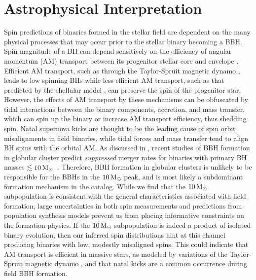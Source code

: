 \section{Astrophysical Interpretation} \label{sec:astro}


Spin predictions of binaries formed in the stellar field are dependent on the many physical processes that may occur prior to the stellar binary becoming a BBH.  Spin magnitude of a BH can depend sensitively on the efficiency of angular momentum (AM) transport between its progenitor stellar core and envelope \citep{2203.02515}. Efficient AM transport, such as through the Taylor-Spruit magnetic dynamo \citep{10.1051/0004-6361:20011465}, leads to low spinning BHs \citep{10.3847/2041-8213/ab339b} while less efficient AM transport, such as that predicted by the shellular model \citep{1992A&A...265..115Z,2012A&A...537A.146E,10.3847/1538-4365/aacb24,2019MNRAS.485.4641C}, can preserve the spin of the progenitor star. However, the effects of AM transport by these mechanisms can be obfuscated by tidal interactions between the binary components, accretion, and mass transfer, which can spin up the binary or increase AM transport efficiency, thus shedding spin. Natal supernova kicks are thought to be the leading cause of spin orbit misalignments in field binaries, while tidal forces and mass transfer tend to align BH spins with the orbital AM. As discussed in \citet{2111.03634}, recent studies of BBH formation in globular cluster predict \emph{suppressed} merger rates for binaries with primary BH masses $\lesssim 10 {\,\rm M}_\odot$~\cite{2009.01861,1906.10260,1808.04514}.  Therefore, BBH formation in globular clusters is unlikely to be responsible for the BBHs in the $10{\,\rm M}_\odot$ peak, and is most likely a subdominant formation mechanism in the catalog.
While we find that the $10{\,\rm M}_\odot$ subpopulation is consistent with the general characteristics associated with field formation, large uncertainties in both spin measurements and predictions from population synthesis models prevent us from placing informative constraints on the formation physics. If the $10{\,\rm M}_\odot$ subpopulation is indeed a product of isolated binary evolution, then our inferred spin distributions hint at this channel producing binaries with low, modestly misaligned spins. This could indicate that AM transport is efficient in massive stars, as modeled by variations of the Taylor-Spruit magnetic dynamo \citep{1706.07053}, and that natal kicks are a common occurrence during field BBH formation.

